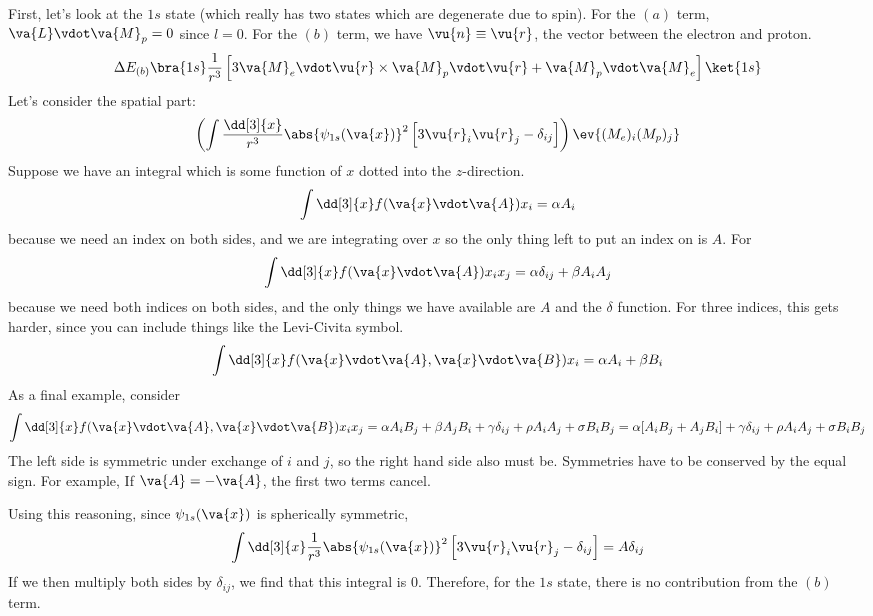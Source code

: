 \documentclass[a4paper,twoside,master.tex]{subfiles}
\begin{document}
First, let's look at the $ 1s $ state (which really has two states which are degenerate due to spin). For the $ (a) $ term, $ \va{L} \vdot \va{M}_p = 0 $ since $ l = 0 $. For the $ (b) $ term, we have $ \vu{n} \equiv \vu{r} $, the vector between the electron and proton.
\begin{equation}
    \Delta E_{(b)} \bra{1s} \frac{1}{r^3} \left[ 3 \va{M}_e \vdot \vu{r} \times \va{M}_p \vdot \vu{r} + \va{M}_p \vdot \va{M}_e \right]\ket{1s}
\end{equation}
Let's consider the spatial part:
\begin{equation}
    \left(\int \frac{\dd[3]{x}}{r^3} \abs{\psi_{1s}(\va{x})}^2 \left[ 3 \vu{r}_i \vu{r}_j - \delta_{ij} \right]\right) \ev{(M_e)_i (M_p)_j}
\end{equation}
Suppose we have an integral which is some function of $ x $ dotted into the $ z $-direction.
\begin{equation}
    \int \dd[3]{x} f(\va{x} \vdot \va{A}) x_i = \alpha A_i
\end{equation}
because we need an index on both sides, and we are integrating over $ x $ so the only thing left to put an index on is $ A $.
For
\begin{equation}
    \int \dd[3]{x} f(\va{x} \vdot \va{A}) x_i x_j = \alpha \delta_{ij} + \beta A_i A_j
\end{equation}
because we need both indices on both sides, and the only things we have available are $ A $ and the $\delta$ function. For three indices, this gets harder, since you can include things like the Levi-Civita symbol.
\begin{equation}
    \int \dd[3]{x} f(\va{x} \vdot \va{A}, \va{x} \vdot \va{B}) x_i = \alpha A_i + \beta B_i
\end{equation}
As a final example, consider
\begin{equation}
    \int \dd[3]{x}f(\va{x} \vdot \va{A}, \va{x} \vdot \va{B}) x_i x_j = \alpha A_i B_j + \beta A_j B_i + \gamma \delta_{ij} + \rho A_i A_j + \sigma B_i B_j = \alpha [A_i B_j + A_j B_i] + \gamma \delta_{ij} + \rho A_i A_j + \sigma B_i B_j
\end{equation}
The left side is symmetric under exchange of $ i $ and $ j $, so the right hand side also must be. Symmetries have to be conserved by the equal sign. For example, If $ \va{A} = - \va{A} $, the first two terms cancel.

Using this reasoning, since $ \psi_{1s}(\va{x}) $ is spherically symmetric,
\begin{equation}
    \int \dd[3]{x} \frac{1}{r^3} \abs{\psi_{1s}(\va{x})}^2 \left[ 3 \vu{r}_i \vu{r}_j - \delta_{ij} \right] = A \delta_{ij}
\end{equation}
If we then multiply both sides by $ \delta_{ij} $, we find that this integral is $ 0 $. Therefore, for the $ 1s $ state, there is no contribution from the $ (b) $ term.
\end{document}
